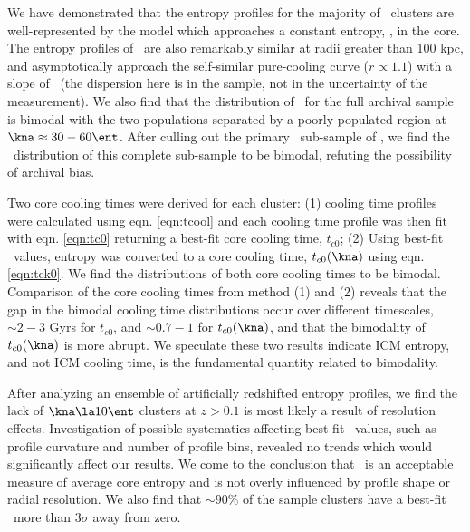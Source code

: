 \documentclass[apj]{emulateapj}
\begin{document}
We have demonstrated that the entropy profiles for the majority of
\accept\ clusters are well-represented by the model which approaches a
constant entropy, \kna, in the core. The entropy profiles of
\accept\ are also remarkably similar at radii greater than 100 kpc,
and asymptotically approach the self-similar pure-cooling curve ($r
\propto 1.1$) with a slope of \alphafs\ (the dispersion here is in the
sample, not in the uncertainty of the measurement). We also find that
the distribution of \kna\ for the full archival sample is bimodal with
the two populations separated by a poorly populated region at $\kna
\approx 30-60 \ent$. After culling out the primary \hifl\ sub-sample
of \citet{hiflugcs1}, we find the \kna\ distribution of this complete
sub-sample to be bimodal, refuting the possibility of archival bias.

Two core cooling times were derived for each cluster: (1) cooling time
profiles were calculated using eqn. \ref{eqn:tcool} and each cooling
time profile was then fit with eqn. \ref{eqn:tc0} returning a best-fit
core cooling time, $t_{c0}$; (2) Using best-fit \kna\ values, entropy
was converted to a core cooling time, $t_{c0}(\kna)$ using
eqn. \ref{eqn:tck0}. We find the distributions of both core cooling
times to be bimodal. Comparison of the core cooling times from method
(1) and (2) reveals that the gap in the bimodal cooling time
distributions occur over different timescales, $\sim 2-3$ Gyrs for
$t_{c0}$, and $\sim 0.7-1$ for $t_{c0}(\kna)$, and that the bimodality
of $t_{c0}(\kna)$ is more abrupt. We speculate these two results
indicate ICM entropy, and not ICM cooling time, is the fundamental
quantity related to bimodality.

After analyzing an ensemble of artificially redshifted entropy
profiles, we find the lack of $\kna \la 10 \ent$ clusters at $z > 0.1$
is most likely a result of resolution effects. Investigation of
possible systematics affecting best-fit \kna\ values, such as profile
curvature and number of profile bins, revealed no trends which would
significantly affect our results. We come to the conclusion that
\kna\ is an acceptable measure of average core entropy and is not
overly influenced by profile shape or radial resolution. We also find
that $\sim90\%$ of the sample clusters have a best-fit \kna\ more than
$3\sigma$ away from zero.
\end{document}
